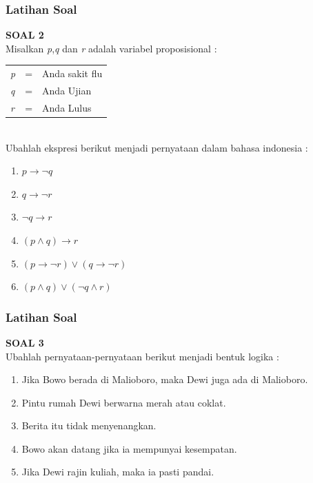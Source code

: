 \documentclass[handout]{beamer}
\theoremstyle{definition}
\theoremstyle{example}
\begin{document}
\begin{frame}
	\frametitle{Latihan Soal}
	\textbf{SOAL 2}\\	
	Misalkan \textit{p},\textit{q} dan \textit{r} adalah variabel proposisional :\\	 
	\begin{tabular}{l c l}
		\textit{p} & = & Anda sakit flu\\
		\textit{q} & = & Anda Ujian\\
		\textit{r} & = & Anda Lulus
	\end{tabular}\\	
	Ubahlah ekspresi berikut menjadi pernyataan dalam bahasa indonesia : \\	
	\begin{enumerate}
		\item $p \rightarrow \neg q$
		\item $q \rightarrow \neg r$
		\item $\neg q \rightarrow r$
		\item $(p \wedge q) \rightarrow r$
		\item $(p \rightarrow \neg r) \vee (q \rightarrow \neg r)$
		\item $(p \wedge q) \vee (\neg q \wedge r)$
	\end{enumerate}		
\end{frame}

\begin{frame}
	\frametitle{Latihan Soal}
	\textbf{SOAL 3}\\	
	Ubahlah pernyataan-pernyataan berikut menjadi bentuk logika :\\	 	
	\begin{enumerate}
		\item Jika Bowo berada di Malioboro, maka Dewi juga ada di Malioboro.
		\item Pintu rumah Dewi berwarna merah atau coklat.
		\item Berita itu tidak menyenangkan.
		\item Bowo akan datang jika ia mempunyai kesempatan.
		\item Jika Dewi rajin kuliah, maka ia pasti pandai.		
	\end{enumerate}		
\end{frame}
\end{document}
